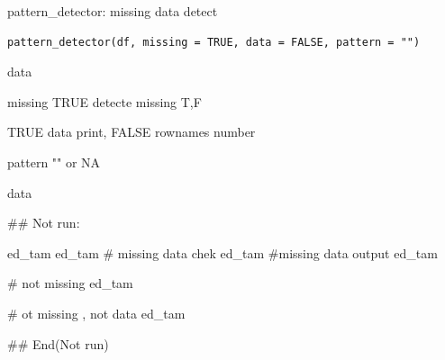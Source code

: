 \documentclass[a4paper]{book}
\begin{document}
%
\begin{Description}
pattern\_detector: missing data detect
\end{Description}
%
\begin{Usage}
\begin{verbatim}
pattern_detector(df, missing = TRUE, data = FALSE, pattern = "")
\end{verbatim}
\end{Usage}
%
\begin{Arguments}
\begin{ldescription}
\item[\code{df}] data

\item[\code{missing}] missing TRUE detecte missing T,F

\item[\code{data}] TRUE data print, FALSE rownames number

\item[\code{pattern}] pattern "" or  NA
\end{ldescription}
\end{Arguments}
%
\begin{Value}
data
\end{Value}
%
\begin{Examples}
\begin{ExampleCode}

\#\# Not run: 

ed_tam %
ed_tam %
# missing data chek
ed_tam %
#missing data output
ed_tam %

# not missing
ed_tam %

# ot missing , not data
ed_tam %



## End(Not run)


\end{ExampleCode}
\end{Examples}
\end{document}
